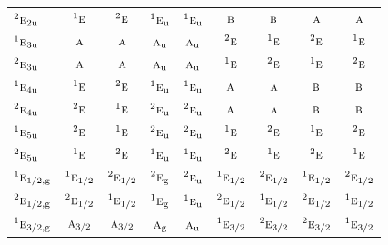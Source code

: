 \documentclass[10pt,a4paper]{article}
\numberwithin{equation}{section}
\newcommand{\irr}[1]{\text{\normalfont\scshape #1}}
\newcommand{\conjpair}[1]{{}^{#1}}
\newcommand{\ptag}[1]{\mathrm{#1}}
\begin{document}
{\begin{longtable}{@{}lcccccccc@{}}
$\conjpair{2}\irr{e}_{2\ptag{u}}$ & $\conjpair{1}\irr{e}$ & $\conjpair{2}\irr{e}$ & $\conjpair{1}\irr{e}_{\ptag{u}}$ & $\conjpair{1}\irr{e}_{\ptag{u}}$ & $\irr{b}$ & $\irr{b}$ & $\irr{a}$ & $\irr{a}$\\
$\conjpair{1}\irr{e}_{3\ptag{u}}$ & $\irr{a}$ & $\irr{a}$ & $\irr{a}_{\ptag{u}}$ & $\irr{a}_{\ptag{u}}$ & $\conjpair{2}\irr{e}$ & $\conjpair{1}\irr{e}$ & $\conjpair{2}\irr{e}$ & $\conjpair{1}\irr{e}$\\
$\conjpair{2}\irr{e}_{3\ptag{u}}$ & $\irr{a}$ & $\irr{a}$ & $\irr{a}_{\ptag{u}}$ & $\irr{a}_{\ptag{u}}$ & $\conjpair{1}\irr{e}$ & $\conjpair{2}\irr{e}$ & $\conjpair{1}\irr{e}$ & $\conjpair{2}\irr{e}$\\
$\conjpair{1}\irr{e}_{4\ptag{u}}$ & $\conjpair{1}\irr{e}$ & $\conjpair{2}\irr{e}$ & $\conjpair{1}\irr{e}_{\ptag{u}}$ & $\conjpair{1}\irr{e}_{\ptag{u}}$ & $\irr{a}$ & $\irr{a}$ & $\irr{b}$ & $\irr{b}$\\
$\conjpair{2}\irr{e}_{4\ptag{u}}$ & $\conjpair{2}\irr{e}$ & $\conjpair{1}\irr{e}$ & $\conjpair{2}\irr{e}_{\ptag{u}}$ & $\conjpair{2}\irr{e}_{\ptag{u}}$ & $\irr{a}$ & $\irr{a}$ & $\irr{b}$ & $\irr{b}$\\
$\conjpair{1}\irr{e}_{5\ptag{u}}$ & $\conjpair{2}\irr{e}$ & $\conjpair{1}\irr{e}$ & $\conjpair{2}\irr{e}_{\ptag{u}}$ & $\conjpair{2}\irr{e}_{\ptag{u}}$ & $\conjpair{1}\irr{e}$ & $\conjpair{2}\irr{e}$ & $\conjpair{1}\irr{e}$ & $\conjpair{2}\irr{e}$\\
$\conjpair{2}\irr{e}_{5\ptag{u}}$ & $\conjpair{1}\irr{e}$ & $\conjpair{2}\irr{e}$ & $\conjpair{1}\irr{e}_{\ptag{u}}$ & $\conjpair{1}\irr{e}_{\ptag{u}}$ & $\conjpair{2}\irr{e}$ & $\conjpair{1}\irr{e}$ & $\conjpair{2}\irr{e}$ & $\conjpair{1}\irr{e}$\\
$\conjpair{1}\irr{e}_{1/2,\ptag{g}}$ & $\conjpair{1}\irr{e}_{1/2}$ & $\conjpair{2}\irr{e}_{1/2}$ & $\conjpair{2}\irr{e}_{\ptag{g}}$ & $\conjpair{2}\irr{e}_{\ptag{u}}$ & $\conjpair{1}\irr{e}_{1/2}$ & $\conjpair{2}\irr{e}_{1/2}$ & $\conjpair{1}\irr{e}_{1/2}$ & $\conjpair{2}\irr{e}_{1/2}$\\
$\conjpair{2}\irr{e}_{1/2,\ptag{g}}$ & $\conjpair{2}\irr{e}_{1/2}$ & $\conjpair{1}\irr{e}_{1/2}$ & $\conjpair{1}\irr{e}_{\ptag{g}}$ & $\conjpair{1}\irr{e}_{\ptag{u}}$ & $\conjpair{2}\irr{e}_{1/2}$ & $\conjpair{1}\irr{e}_{1/2}$ & $\conjpair{2}\irr{e}_{1/2}$ & $\conjpair{1}\irr{e}_{1/2}$\\
$\conjpair{1}\irr{e}_{3/2,\ptag{g}}$ & $\irr{a}_{3/2}$ & $\irr{a}_{3/2}$ & $\irr{a}_{\ptag{g}}$ & $\irr{a}_{\ptag{u}}$ & $\conjpair{1}\irr{e}_{3/2}$ & $\conjpair{2}\irr{e}_{3/2}$ & $\conjpair{2}\irr{e}_{3/2}$ & $\conjpair{1}\irr{e}_{3/2}$\\

\end{longtable}}
\end{document}
